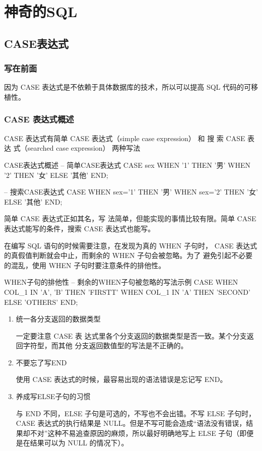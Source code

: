 \chapter{神奇的SQL}
\section{CASE表达式}
\subsection{写在前面}
因为 CASE 表达式是不依赖于具体数据库的技术，所以可以提高 SQL 代码的可移植性。
\subsection{CASE 表达式概述}
CASE 表达式有简单 CASE 表达式（simple case expression） 和 搜 索 CASE 表 达 式（searched case expression）
两种写法
\begin{sql}{CASE表达式概述}
-- 简单CASE表达式 
CASE sex
WHEN '1' THEN '男'
WHEN '2' THEN '女'
ELSE '其他' END;

-- 搜索CASE表达式 
CASE 
WHEN sex='1' THEN '男'
WHEN sex='2' THEN '女'
ELSE '其他' END;
\end{sql}
简单 CASE 表达式正如其名，写
法简单，但能实现的事情比较有限。简单 CASE 表达式能写的条件，搜索
CASE 表达式也能写。

在编写 SQL 语句的时候需要注意，在发现为真的 WHEN 子句时，
CASE 表达式的真假值判断就会中止，而剩余的 WHEN 子句会被忽略。为了
避免引起不必要的混乱，使用 WHEN 子句时要注意条件的排他性。
\begin{sql}{WHEN子句的排他性}
-- 剩余的WHEN子句被忽略的写法示例
CASE 
WHEN COL_1 IN {'A', 'B'} THEN 'FIRSTT'
WHEN COL_1 IN {'A'} THEN 'SECOND'
     ELSE 'OTHERS' END;
\end{sql}
\catutions

\begin{enumerate}
\item 统一各分支返回的数据类型

一定要注意 CASE 表
达式里各个分支返回的数据类型是否一致。某个分支返回字符型，而其他
分支返回数值型的写法是不正确的。

\item 不要忘了写END

使用 CASE 表达式的时候，最容易出现的语法错误是忘记写 END。

\item 养成写ELSE子句的习惯

与 END 不同，ELSE 子句是可选的，不写也不会出错。不写 ELSE 子句时，
CASE 表达式的执行结果是 NULL。但是不写可能会造成“语法没有错误，结果却不对”这种不易追查原因的麻烦，所以最好明确地写上 ELSE 子句（即便
是在结果可以为 NULL 的情况下）。

\end{enumerate}


\subsection{}
\subsection{}
\subsection{}





